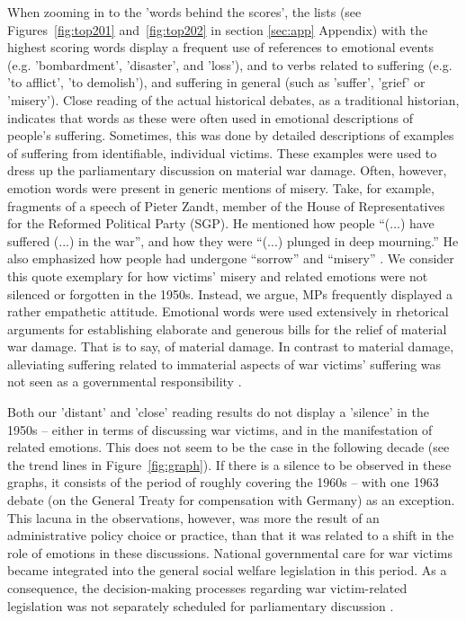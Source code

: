 \documentclass{dhbenelux}
\begin{document}
When zooming in to the 'words behind the scores', the lists (see Figures~\ref{fig:top201} and~\ref{fig:top202} in section \ref{sec:app} Appendix) with the highest scoring words display a frequent use of references to emotional events (e.g. 'bombardment', 'disaster', and 'loss'), and to verbs related to suffering (e.g. 'to afflict', 'to demolish'), and suffering in general (such as 'suffer', 'grief' or 'misery').  Close reading of the actual historical debates, as a traditional historian, indicates that words as these were often used in emotional descriptions of people’s suffering. Sometimes, this was done by detailed descriptions of examples of suffering from identifiable, individual victims. These examples were used to dress up the parliamentary discussion on material war damage. Often, however, emotion words were present in generic mentions of misery. Take, for example, fragments of a speech of Pieter Zandt, member of the House of Representatives for the Reformed Political Party (SGP). He mentioned how people ``(...) have suffered (...) in the war'', and how they were ``(...) plunged in deep mourning.'' He also emphasized how people had undergone ``sorrow'' and ``misery'' \citep[p.305]{noauthor_handelingen_1949-1950}. We consider this quote exemplary for how victims' misery and related emotions were not silenced or forgotten in the 1950s. Instead, we argue, MPs frequently displayed a rather empathetic attitude. Emotional words were used extensively in rhetorical arguments for establishing elaborate and generous bills for the relief of material war damage. That is to say, of material damage. 
%
In contrast to material damage, alleviating suffering related to immaterial aspects of war victims' suffering was not seen as a governmental responsibility \citep[p.305]{noauthor_handelingen_1949-1950}. 

Both our 'distant' and 'close' reading results do not display a 'silence' in the 1950s – either in terms of discussing war victims, and in the manifestation of related emotions. This does not seem to be the case in the following decade (see the trend lines in 
Figure~\ref{fig:graph}). 
If there is a silence to be observed in these graphs, it consists of the period of roughly covering the 1960s – with one 1963 debate (on the General Treaty for compensation with Germany) as an exception. This lacuna in the observations, however, was more the result of an administrative policy choice or practice, than that it was related to a shift in the role of emotions in these discussions. National governmental care for war victims became integrated into the general social welfare legislation in this period. As a consequence, the decision-making processes regarding war victim-related legislation was not separately scheduled for parliamentary discussion \citep{piersma_bevochten_2010}.
\end{document}

